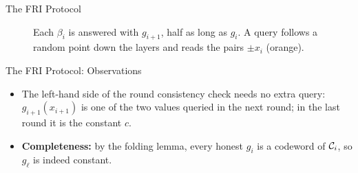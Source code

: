\documentclass{zkdl-presentation-template}
\newcommand{\friquery}[3]{%
    \foreach \i in {#3} {
        \node[qcell] at ([xshift=0.32cm*\i-0.16cm*#2+0.16cm]#1) {};
    }
}
\begin{document}
\begin{frame}{The FRI Protocol}
\begin{figure}
{%
            }
            \caption{Each $\beta_i$ is answered with $g_{i+1}$, half as long as $g_i$. A query follows a random point down the layers and reads the pairs $\pm x_i$ (orange).}
        \end{figure}
    \end{frame}

    \begin{frame}{The FRI Protocol: Observations}
        \begin{itemize}
            \item The left-hand side of the round consistency check needs no extra query: $g_{i+1}(x_{i+1})$ is one of the two values queried in the next round; in the last round it is the constant $c$.\pause
            \item \textbf{Completeness:} by the folding lemma, every honest $g_i$ is a codeword of $\mathcal{C}_i$, so $g_\ell$ is indeed constant.
        \end{itemize}
    \end{frame}
\end{document}
